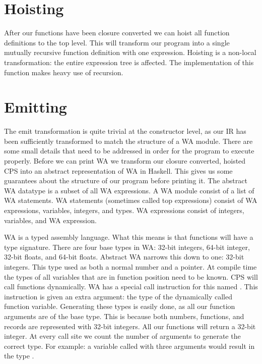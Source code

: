 \section{\label{section:hoist}Hoisting}
After our functions have been closure converted we can hoist all function definitions to the top level. This will transform our program into a single mutually recursive function definition with one expression. Hoisting is a non-local transformation: the entire expression tree is affected. The implementation of this function makes heavy use of recursion.

\section{\label{section:hoist}Emitting}
The emit transformation is quite trivial at the constructor level, as our \ac{IR} has been sufficiently transformed to match the structure of a \ac{WA} module. There are some small details that need to be addressed in order for the program to execute properly. Before we can print \ac{WA} we transform our closure converted, hoisted \ac{CPS} into an abstract representation of \ac{WA} in Haskell. This gives us some guarantees about the structure of our program before printing it. The abstract \ac{WA} datatype is a subset of all \ac{WA} expressions. A \ac{WA} module consist of a list of \ac{WA} statements. \ac{WA} statements (sometimes called top expressions) consist of \ac{WA} expressions, variables, integers, and types. \ac{WA} expressions consist of integers, variables, and \ac{WA} expression.

\ac{WA} is a typed assembly language. What this means is that functions will have a type signature. There are four base types in \ac{WA}: 32-bit integers, 64-bit integer, 32-bit floats, and 64-bit floats. Abstract \ac{WA} narrows this down to one: 32-bit integers. This type used as both a normal number and a pointer. At compile time the types of all variables that are in function position need to be known. \ac{CPS} will call functions dynamically. \ac{WA} has a special call instruction for this named . This instruction is given an extra argument: the type of the dynamically called function variable. Generating these types is easily done, as all our function arguments are of the base type. This is because both numbers, functions, and records are represented with 32-bit integers. All our functions will return a 32-bit integer. At every call site we count the number of arguments to generate the correct type. For example: a variable  called with three arguments would result in the type .

